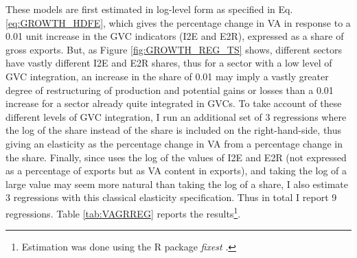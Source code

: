 \documentclass[a4paper]{article}
\begin{document}
These models are first estimated in log-level form as specified in Eq. \ref{eq:GROWTH_HDFE}, which gives the percentage change in VA in response to a 0.01 unit increase in the GVC indicators (I2E and E2R), expressed as a share of gross exports. But, as Figure \ref{fig:GROWTH_REG_TS} shows, different sectors have vastly different I2E and E2R shares, thus for a sector with a low level of GVC integration, an increase in the share of 0.01 may imply a vastly greater degree of restructuring of production and potential gains or losses than a 0.01 increase for a sector already quite integrated in GVCs. To take account of these different levels of GVC integration, I run an additional set of 3 regressions where the log of the share instead of the share is included on the right-hand-side, thus giving an elasticity as the percentage change in VA from a percentage change in the share. Finally, since \citet{Kummritz20161} uses the log of the values of I2E and E2R (not expressed as a percentage of exports but as VA content in exports), and taking the log of a large value may seem more natural than taking the log of a share, I also estimate 3 regressions with this classical elasticity specification. Thus in total I report 9 regressions. %
Table \ref{tab:VAGRREG} reports the results\footnote{Estimation was done using the R package \textit{fixest} \citep{fixest2018}.}. \newline %
\end{document}
